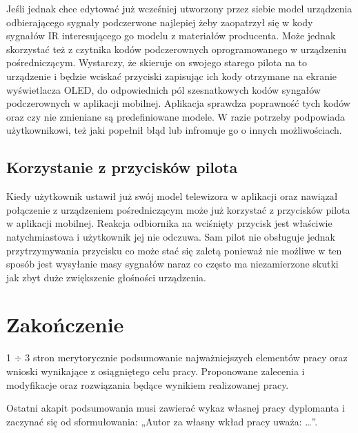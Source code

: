 \documentclass[12pt,twoside]{article}
\begin{document}
Jeśli jednak chce edytować już wcześniej utworzony przez siebie model urządzenia odbierającego sygnały podczerwone najlepiej żeby zaopatrzył się w kody sygnałów IR interesującego go modelu z materiałów producenta. Może jednak skorzystać też z czytnika kodów podczerownych oprogramowanego w urządzeniu pośredniczącym. Wystarczy, że skieruje on swojego starego pilota na to urządzenie i będzie wciskać przyciski zapisując ich kody otrzymane na ekranie wyświetlacza OLED, do odpowiednich pól szesnatkowych kodów syngałów podczerownych w aplikacji mobilnej. Aplikacja sprawdza poprawność tych kodów oraz czy nie zmieniane są predefiniowane modele. W razie potrzeby podpowiada użytkownikowi, też jaki popełnił błąd lub infromuje go o innych możliwościach.

\subsection{Korzystanie z przycisków pilota}
Kiedy użytkownik ustawił już swój model telewizora w aplikacji oraz nawiązał połączenie z urządzeniem pośredniczącym może już korzystać z przycisków pilota w aplikacji mobilnej. Reakcja odbiornika na wciśnięty przycisk jest właściwie natychmiastowa i użytkownik jej nie odczuwa. Sam pilot nie obsługuje jednak przytrzymywania przycisku co może stać się zaletą ponieważ nie możliwe w ten sposób jest wysyłanie masy sygnałów naraz co często ma niezamierzone skutki jak zbyt duże zwiększenie głośności urządzenia.

\clearpage

\section{Zakończenie}

1 $\div$ 3 stron merytorycznie podsumowanie najważniejszych elementów pracy oraz wnioski wynikające z osiągniętego celu pracy. Proponowane zalecenia i modyfikacje oraz rozwiązania będące wynikiem realizowanej pracy.

Ostatni akapit podsumowania musi zawierać wykaz własnej pracy dyplomanta i zaczynać się od sformułowania: „Autor za własny wkład pracy uważa: \ldots”.

\clearpage
{}



\clearpage

\makesummary
\end{document}
